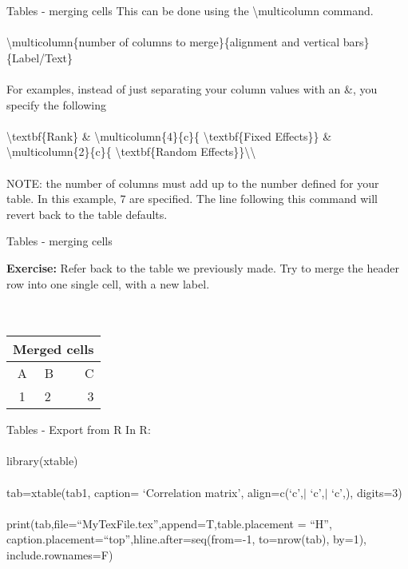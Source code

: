 \documentclass[xcolor=dvipsnames]{beamer}
\begin{document}
\begin{frame}{Tables - merging cells}
This can be done using the \textbackslash multicolumn command.\\~\\
\textbackslash multicolumn\{number of columns to merge\}\{alignment and vertical bars\}\{Label/Text\}\\~\\
For examples, instead of just separating your column values with an \&, you specify the following\\~\\
\textbackslash textbf\{Rank\} \& \textbackslash multicolumn\{4\}\{c\}\{ \textbackslash textbf\{Fixed Effects\}\} \& \textbackslash multicolumn\{2\}\{c\}\{ \textbackslash textbf\{Random Effects\}\}\textbackslash \textbackslash \\~\\

NOTE: the number of columns must add up to the number defined for your table. In this example, 7 are specified. The line following this command will revert back to the table defaults.
\end{frame}


\begin{frame}{Tables - merging cells}

{\Large \textbf{Exercise:} Refer back to the table we previously made. Try to merge the header row into one single cell, with a new label.}\\
\hrulefill ~\\~\\
\begin{table}[H]    
	\begin{center}
		\begin{tabular}{c|l|r}
			\multicolumn{3}{c}{Merged cells} \\
			\hline
			A  & B & C \\
			\hline
			1 & 2 & 3\\
			\hline
		\end{tabular}
	\end{center}
\end{table}
\end{frame}

\begin{frame}{\LARGE{Tables - Export from R}}
In R:\\~\\

library(xtable)\\~\\

tab=xtable(tab1, caption= `Correlation matrix', 
align=c(`c',$\vert$ `c',$\vert$ `c',), digits=3) \\~\\

print(tab,file=``MyTexFile.tex'',append=T,table.placement = ``H'', caption.placement=``top'',hline.after=seq(from=-1, to=nrow(tab), by=1), include.rownames=F) 

\end{frame}
\end{document}

